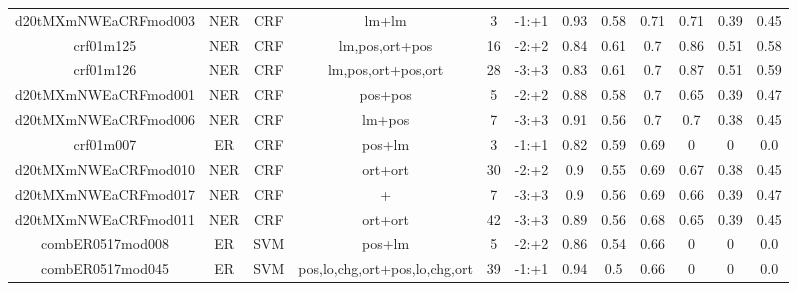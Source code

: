 \documentclass[a4paper]{article}
\begin{document}
\begin{landscape}
\begin{center}
\begin{tabular}{ |c|c|c|c|c|c|c|c|c|c|c|c|}
 	

 
 	
 	\small{ d20tMXmNWEaCRFmod003 } & NER & CRF & lm+lm  &  3 &  -1:+1  &  0.93 & 0.58 & 0.71  &  0.71 & 0.39 & 0.45 \\
 	

 
 	
 	\small{ crf01m125 } & NER & CRF & lm,pos,ort+pos  &  16 &  -2:+2  &  0.84 & 0.61 & 0.7  &  0.86 & 0.51 & 0.58 \\
 	

 
 	
 	\small{ crf01m126 } & NER & CRF & lm,pos,ort+pos,ort  &  28 &  -3:+3  &  0.83 & 0.61 & 0.7  &  0.87 & 0.51 & 0.59 \\
 	

 
 	
 	\small{ d20tMXmNWEaCRFmod001 } & NER & CRF & pos+pos  &  5 &  -2:+2  &  0.88 & 0.58 & 0.7  &  0.65 & 0.39 & 0.47 \\
 	

 
 	
 	\small{ d20tMXmNWEaCRFmod006 } & NER & CRF & lm+pos  &  7 &  -3:+3  &  0.91 & 0.56 & 0.7  &  0.7 & 0.38 & 0.45 \\
 	

 
 	
 	\small{ crf01m007 } & ER & CRF & pos+lm  &  3 &  -1:+1  &  0.82 & 0.59 & 0.69  &  0 & 0 & 0.0 \\
 	

 
 	
 	\small{ d20tMXmNWEaCRFmod010 } & NER & CRF & ort+ort  &  30 &  -2:+2  &  0.9 & 0.55 & 0.69  &  0.67 & 0.38 & 0.45 \\
 	

 
 	
 	\small{ d20tMXmNWEaCRFmod017 } & NER & CRF & +  &  7 &  -3:+3  &  0.9 & 0.56 & 0.69  &  0.66 & 0.39 & 0.47 \\
 	

 
 	
 	\small{ d20tMXmNWEaCRFmod011 } & NER & CRF & ort+ort  &  42 &  -3:+3  &  0.89 & 0.56 & 0.68  &  0.65 & 0.39 & 0.45 \\
 	

 
 	
 	\small{ combER0517mod008 } & ER & SVM & pos+lm  &  5 &  -2:+2  &  0.86 & 0.54 & 0.66  &  0 & 0 & 0.0 \\
 	

 
 	
 	\small{ combER0517mod045 } & ER & SVM & pos,lo,chg,ort+pos,lo,chg,ort  &  39 &  -1:+1  &  0.94 & 0.5 & 0.66  &  0 & 0 & 0.0 \\
 	


\end{tabular}
\end{center}
\end{landscape}
\end{document}
